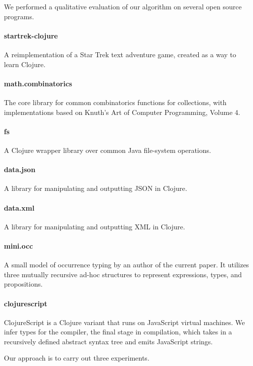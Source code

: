 
We performed a qualitative evaluation of our algorithm
on several open source programs.

\paragraph{startrek-clojure}
A reimplementation of a Star Trek text adventure game,
created as a way to learn Clojure.

\paragraph{math.combinatorics}
The core library for common combinatorics functions
for collections,
with implementations based on Knuth's Art of Computer
Programming, Volume 4.

\paragraph{fs}
A Clojure wrapper library over common Java file-system operations.

\paragraph{data.json}
A library for manipulating and outputting JSON in Clojure.

\paragraph{data.xml}
A library for manipulating and outputting XML in Clojure.

\paragraph{mini.occ}
A small model of occurrence typing by an author of the
current paper. It utilizes three mutually recursive
ad-hoc structures to represent expressions, types,
and propositions.

\paragraph{clojurescript}
ClojureScript is a Clojure variant that runs on JavaScript
virtual machines. We infer types for the compiler, the final
stage in compilation, which takes in a recursively
defined abstract syntax tree and emits JavaScript strings.

Our approach is to carry out three experiments.

